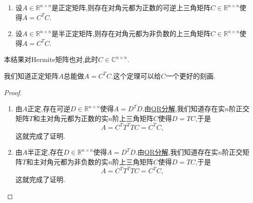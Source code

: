 \documentclass[../../main.tex]{subfiles}%
\begin{document}
\begin{theorem}[(半)正定矩阵的Chelesky分解]\label{theorem:(半)正定矩阵的Chelesky分解}
\begin{enumerate}
\item 设\( A \in \mathbb{R}^{n \times n} \)是正定矩阵,则存在对角元都为正数的可逆上三角矩阵\( C \in \mathbb{R}^{n \times n} \)使得\( A = C^T C \).

\item 设\( A \in \mathbb{R}^{n \times n} \)是半正定矩阵,则存在对角元都为非负数的上三角矩阵\( C \in \mathbb{R}^{n \times n} \)使得\( A = C^T C \).
\end{enumerate}
\end{theorem}
\begin{note}
本结果对Hermite矩阵也对,此时\( C \in \mathbb{C}^{n \times n} \).

我们知道正定矩阵\( A \)总能做\( A = C^T C \).这个定理可以给\( C \)一个更好的刻画.
\end{note}
\begin{proof}
\begin{enumerate}
\item 由\( A \)正定,存在可逆\( D \in \mathbb{R}^{n \times n} \)使得\( A = D^T D \).由\hyperref[theorem:施密特正交化对应的矩阵分解,QR分解]{QR分解},我们知道存在实\( n \)阶正交矩阵\( T \)和主对角元都为正数的实\( n \)阶上三角矩阵\( C \)使得\( D = TC \),于是
\[
A = C^T T^T T C = C^T C,
\]
这就完成了证明.

\item 由\( A \)半正定,存在\( D \in \mathbb{R}^{n \times n} \)使得\( A = D^T D \).由\hyperref[theorem:施密特正交化对应的矩阵分解,QR分解]{QR分解},我们知道存在实\( n \)阶正交矩阵\( T \)和主对角元都为非负数的实\( n \)阶上三角矩阵\( C \)使得\( D = TC \),于是
\[
A = C^T T^T T C = C^T C,
\]
这就完成了证明.
\end{enumerate}
\end{proof}
\end{document}
